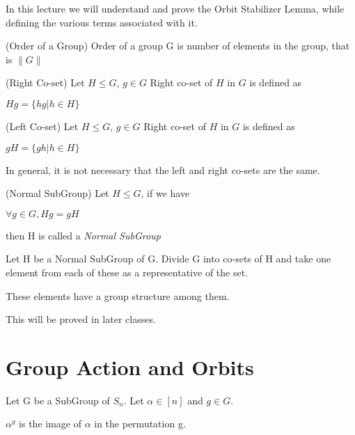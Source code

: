 In this lecture we will understand and prove the Orbit Stabilizer Lemma, while defining the various terms associated with it.


\begin{definition}(Order of a Group) Order of a group G is number of elements in the group, that is $\|G\|$ \end{definition}

\begin{definition}(Right Co-set) Let $H \le G$, $g \in G$ Right co-set of $H$ in $G$ is defined as 
\begin{center}
$Hg = \{hg | h \in H\}$
\end{center}
 \end{definition}

\begin{definition}(Left Co-set) Let $H \le G$, $g \in G$ Right co-set of $H$ in $G$ is defined as 
\begin{center}
$gH = \{gh | h \in H\}$
\end{center}
\end{definition}

\begin{note}
In general, it is not necessary that the left and right co-sets are the same.
\end{note}

\begin{definition}(Normal SubGroup)
Let $H \le G$, if we have 
\begin{center}
$\forall g \in G, Hg= gH$
\end{center}
then H is called a \em Normal SubGroup
\end{definition}

Let H be a Normal SubGroup of G. Divide G into co-sets of H and take one element from each of these as a representative of the set.
\begin{claim} These elements have a group structure among them. \end{claim}
This will be proved in later classes.

\section{Group Action and Orbits}
Let G be a SubGroup of $S_n$. Let $\alpha \in [n]$ and $g \in G$.

\begin{note} $\alpha^g$ is the image of $\alpha$ in the permutation g. \end{note}

